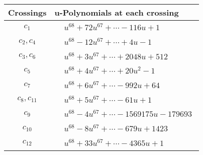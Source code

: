 \documentclass[1p]{elsarticle_modified}
\theoremstyle{definition}
\begin{document}
\begin{tabular}{m{50pt}|m{274pt}}
Crossings & \hspace{64pt}u-Polynomials at each crossing \\
\hline $$\begin{aligned}c_{1}\end{aligned}$$&$\begin{aligned}
&u^{68}+72 u^{67}+\cdots-116 u+1
\end{aligned}$\\
\hline $$\begin{aligned}c_{2},c_{4}\end{aligned}$$&$\begin{aligned}
&u^{68}-12 u^{67}+\cdots+4 u-1
\end{aligned}$\\
\hline $$\begin{aligned}c_{3},c_{6}\end{aligned}$$&$\begin{aligned}
&u^{68}+3 u^{67}+\cdots+2048 u+512
\end{aligned}$\\
\hline $$\begin{aligned}c_{5}\end{aligned}$$&$\begin{aligned}
&u^{68}+4 u^{67}+\cdots+20 u^2-1
\end{aligned}$\\
\hline $$\begin{aligned}c_{7}\end{aligned}$$&$\begin{aligned}
&u^{68}+6 u^{67}+\cdots-992 u+64
\end{aligned}$\\
\hline $$\begin{aligned}c_{8},c_{11}\end{aligned}$$&$\begin{aligned}
&u^{68}+5 u^{67}+\cdots-61 u+1
\end{aligned}$\\
\hline $$\begin{aligned}c_{9}\end{aligned}$$&$\begin{aligned}
&u^{68}-4 u^{67}+\cdots-1569175 u-179693
\end{aligned}$\\
\hline $$\begin{aligned}c_{10}\end{aligned}$$&$\begin{aligned}
&u^{68}-8 u^{67}+\cdots-679 u+1423
\end{aligned}$\\
\hline $$\begin{aligned}c_{12}\end{aligned}$$&$\begin{aligned}
&u^{68}+33 u^{67}+\cdots-4365 u+1
\end{aligned}$\\
\hline
\end{tabular}\\~\\
\end{document}
